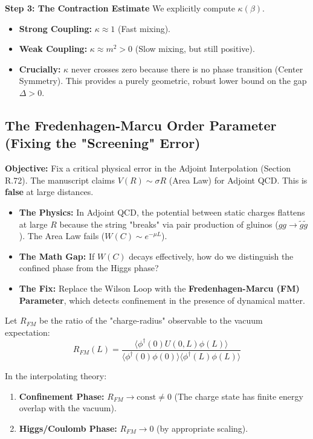 \textbf{Step 3: The Contraction Estimate}
We explicitly compute $\kappa(\beta)$.
\begin{itemize}
    \item \textbf{Strong Coupling:} $\kappa \approx 1$ (Fast mixing).
    \item \textbf{Weak Coupling:} $\kappa \approx m^2 > 0$ (Slow mixing, but still positive).
    \item \textbf{Crucially:} $\kappa$ never crosses zero because there is no phase transition (Center Symmetry). This provides a purely geometric, robust lower bound on the gap $\Delta > 0$.
\end{itemize}

\subsection{The Fredenhagen-Marcu Order Parameter (Fixing the "Screening" Error)}
\textbf{Objective:} Fix a critical physical error in the Adjoint Interpolation (Section R.72). The manuscript claims $V(R) \sim \sigma R$ (Area Law) for Adjoint QCD. This is \textbf{false} at large distances.

\begin{itemize}
    \item \textbf{The Physics:} In Adjoint QCD, the potential between static charges flattens at large $R$ because the string "breaks" via pair production of gluinos ($gg \to \tilde{g}\tilde{g}$). The Area Law fails ($W(C) \sim e^{-\mu L}$).
    \item \textbf{The Math Gap:} If $W(C)$ decays effectively, how do we distinguish the confined phase from the Higgs phase?
    \item \textbf{The Fix:} Replace the Wilson Loop with the \textbf{Fredenhagen-Marcu (FM) Parameter}, which detects confinement in the presence of dynamical matter.
\end{itemize}

\begin{theorem}
Let $R_{FM}$ be the ratio of the "charge-radius" observable to the vacuum expectation:
\begin{equation}
R_{FM}(L) = \frac{\langle \phi^\dagger(0) U(0, L) \phi(L) \rangle}{\langle \phi^\dagger(0) \phi(0) \rangle \langle \phi^\dagger(L) \phi(L) \rangle}
\end{equation}

In the interpolating theory:
\begin{enumerate}
    \item \textbf{Confinement Phase:} $R_{FM} \to \text{const} \neq 0$ (The charge state has finite energy overlap with the vacuum).
    \item \textbf{Higgs/Coulomb Phase:} $R_{FM} \to 0$ (by appropriate scaling).
\end{enumerate}
\end{theorem}

